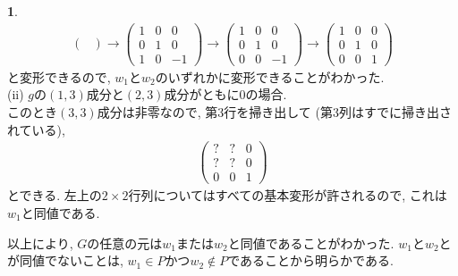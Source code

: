 \documentclass{article}
\theoremstyle{definition}
\newtheorem{ans}{}
\numberwithin{ans}{subsection}
\begin{document}
\begin{ans}
\begin{align*}
\begin{pmatrix}
    \end{pmatrix}
    \rightarrow
    \begin{pmatrix}
      1 & 0 & 0 \\
      0 & 1 & 0 \\
      1 & 0 & -1
    \end{pmatrix}
    \rightarrow
    \begin{pmatrix}
      1 & 0 & 0 \\
      0 & 1 & 0 \\
      0 & 0 & -1
    \end{pmatrix}
    \rightarrow
    \begin{pmatrix}
      1 & 0 & 0 \\
      0 & 1 & 0 \\
      0 & 0 & 1
    \end{pmatrix}
  \end{align*}
  と変形できるので, $w_1$と$w_2$のいずれかに変形できることがわかった.
  \\
  (ii) $g$の$(1, 3)$成分と$(2, 3)$成分がともに$0$の場合.\\
  このとき$(3, 3)$成分は非零なので, 第$3$行を掃き出して (第3列はすでに掃き出されている),
  \begin{align*}
    \begin{pmatrix}
      ? & ? & 0 \\
      ? & ? & 0 \\
      0 & 0 & 1
    \end{pmatrix}
  \end{align*}
  とできる. 左上の$2 \times 2$行列についてはすべての基本変形が許されるので, これは$w_1$と同値である.

  以上により, $G$の任意の元は$w_1$または$w_2$と同値であることがわかった.
  $w_1$と$w_2$とが同値でないことは, $w_1 \in P$かつ$w_2 \notin P$であることから明らかである.
\end{ans}
\end{document}
